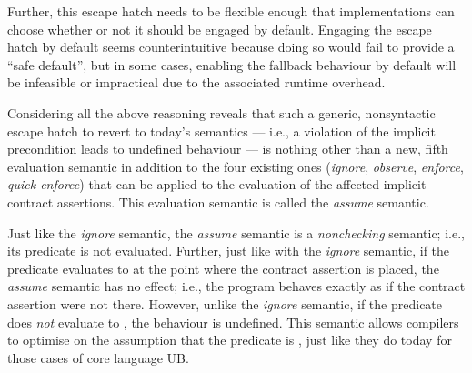 Further, this escape hatch needs to be flexible enough that implementations can choose whether or not it should be engaged by default. Engaging the escape hatch by default seems counterintuitive because doing so would fail to provide a ``safe default'', but in some cases, enabling the fallback behaviour by default will be infeasible or impractical due to the associated runtime overhead.

Considering all the above reasoning reveals that such a generic, nonsyntactic escape hatch to revert to today's semantics --- i.e., a violation of the implicit precondition leads to undefined behaviour --- is nothing other than a new, fifth evaluation semantic in addition to the four existing ones (\emph{ignore}, \emph{observe}, \emph{enforce}, \emph{quick-enforce}) that can be applied to the evaluation of the affected implicit contract assertions. This evaluation semantic is called the \emph{assume} semantic.

Just like the \emph{ignore} semantic, the \emph{assume} semantic is a \emph{nonchecking} semantic; i.e., its predicate is not evaluated. Further, just like with the \emph{ignore} semantic, if the predicate evaluates to  at the point where the contract assertion is placed, the \emph{assume} semantic has no effect; i.e., the program behaves exactly as if the contract assertion were not there. However, unlike the \emph{ignore} semantic, if the predicate does \emph{not} evaluate to , the behaviour is undefined. This semantic allows compilers to optimise on the assumption that the predicate is , just like they do today for those cases of core language UB.


